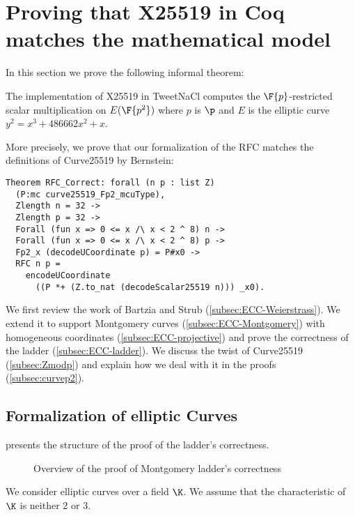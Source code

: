 \section{Proving that X25519 in Coq matches the mathematical model}
\label{sec:maths}

In this section we prove the following informal theorem:

\begin{informaltheorem}
The implementation of X25519 in TweetNaCl computes the
$\F{p}$-restricted \xcoord scalar multiplication on $E(\F{p^2})$ where $p$ is $\p$
and $E$ is the elliptic curve $y^2 = x^3 + 486662 x^2 + x$.
\end{informaltheorem}

More precisely, we prove that our formalization of the RFC matches the definitions of Curve25519 by Bernstein:
\begin{lstlisting}[language=Coq]
Theorem RFC_Correct: forall (n p : list Z)
  (P:mc curve25519_Fp2_mcuType),
  Zlength n = 32 ->
  Zlength p = 32 ->
  Forall (fun x => 0 <= x /\ x < 2 ^ 8) n ->
  Forall (fun x => 0 <= x /\ x < 2 ^ 8) p ->
  Fp2_x (decodeUCoordinate p) = P#x0 ->
  RFC n p =
    encodeUCoordinate
      ((P *+ (Z.to_nat (decodeScalar25519 n))) _x0).
\end{lstlisting}

We first review the work of Bartzia and Strub \cite{BartziaS14} (\ref{subsec:ECC-Weierstrass}).
We extend it to support Montgomery curves (\ref{subsec:ECC-Montgomery})
with homogeneous coordinates (\ref{subsec:ECC-projective}) and prove the
correctness of the ladder (\ref{subsec:ECC-ladder}).
We discuss the twist of Curve25519 (\ref{subsec:Zmodp}) and explain how we deal
with it in the proofs (\ref{subsec:curvep2}).

\subsection{Formalization of elliptic Curves}
\label{subsec:ECC}

 presents the structure of the proof of the ladder's
correctness.
\begin{figure}[h]
  \centering
  
  \caption{Overview of the proof of Montgomery ladder's correctness}
  \label{tikz:ProofHighLevel1}
\end{figure}

We consider elliptic curves over a field $\K$. We assume that the
characteristic of $\K$ is neither 2 or 3.

